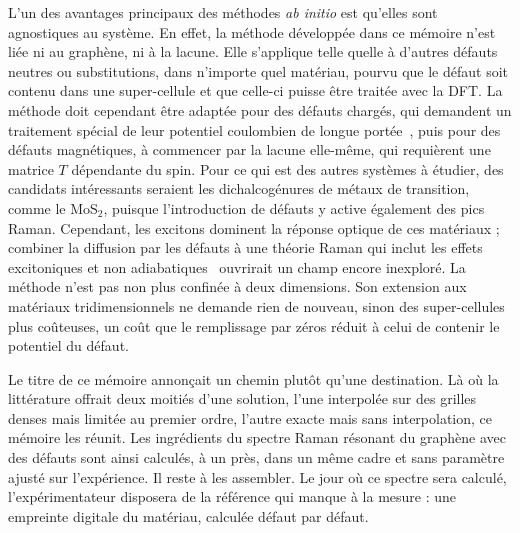 
L'un des avantages principaux des méthodes \textit{ab initio} est qu'elles sont agnostiques au système. En effet, la méthode développée dans ce mémoire n'est liée ni au graphène, ni à la lacune. Elle s'applique telle quelle à d'autres défauts neutres ou substitutions, dans n'importe quel matériau, pourvu que le défaut soit contenu dans une super-cellule et que celle-ci puisse être traitée avec la DFT. La méthode doit cependant être adaptée pour des défauts chargés, qui demandent un traitement spécial de leur potentiel coulombien de longue portée~\cite{luFirstprinciplesIonizedimpurityScattering2021}, puis pour des défauts magnétiques, à commencer par la lacune elle-même, qui requièrent une matrice $T$ dépendante du spin. Pour ce qui est des autres systèmes à étudier, des candidats intéressants seraient les dichalcogénures de métaux de transition, comme le MoS$_2$, puisque l'introduction de défauts y active également des pics Raman. Cependant, les excitons dominent la réponse optique de ces matériaux ; combiner la diffusion par les défauts à une théorie Raman qui inclut les effets excitoniques et non adiabatiques~\cite{reichardtTheoryResonantRaman2019,reichardtNonadiabaticExcitonphononCoupling2020} ouvrirait un champ encore inexploré. La méthode n'est pas non plus confinée à deux dimensions. Son extension aux matériaux tridimensionnels ne demande rien de nouveau, sinon des super-cellules plus coûteuses, un coût que le remplissage par zéros réduit à celui de contenir le potentiel du défaut.

\bigskip

Le titre de ce mémoire annonçait un chemin plutôt qu'une destination. Là où la littérature offrait deux moitiés d'une solution, l'une interpolée sur des grilles denses mais limitée au premier ordre, l'autre exacte mais sans interpolation, ce mémoire les réunit. Les ingrédients du spectre Raman résonant du graphène avec des défauts sont ainsi calculés, à un près, dans un même cadre et sans paramètre ajusté sur l'expérience. Il reste à les assembler. Le jour où ce spectre sera calculé, l'expérimentateur disposera de la référence qui manque à la mesure : une empreinte digitale du matériau, calculée défaut par défaut.